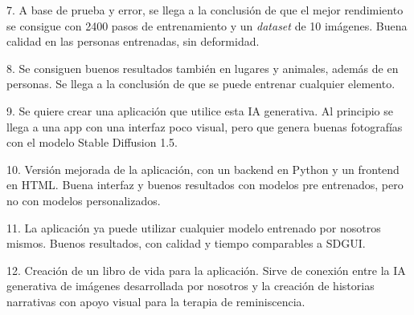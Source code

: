 7. A base de prueba y error, se llega a la conclusión de que el mejor rendimiento se consigue con 2400 pasos de entrenamiento y un \textit{dataset} de 10 imágenes. Buena calidad en las personas entrenadas, sin deformidad.

8. Se consiguen buenos resultados también en lugares y animales, además de en personas. Se llega a la conclusión de que se puede entrenar cualquier elemento.

9. Se quiere crear una aplicación que utilice esta IA generativa. Al principio se llega a una app con una interfaz poco visual, pero que genera buenas fotografías con el modelo Stable Diffusion 1.5.

10. Versión mejorada de la aplicación, con un backend en Python y un frontend en HTML. Buena interfaz y buenos resultados con modelos pre entrenados, pero no con modelos personalizados.

11. La aplicación ya puede utilizar cualquier modelo entrenado por nosotros mismos. Buenos resultados, con calidad y tiempo comparables a SDGUI.

12. Creación de un libro de vida para la aplicación. Sirve de conexión entre la IA generativa de imágenes desarrollada por nosotros y la creación de historias narrativas con apoyo visual para la terapia de reminiscencia.


